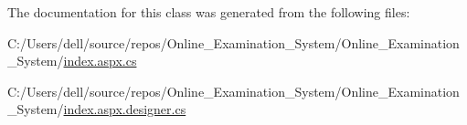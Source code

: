 The documentation for this class was generated from the following files\+:\begin{DoxyCompactItemize}
\item 
C\+:/\+Users/dell/source/repos/\+Online\+\_\+\+Examination\+\_\+\+System/\+Online\+\_\+\+Examination\+\_\+\+System/\mbox{\hyperlink{_index_8aspx_8cs}{index.\+aspx.\+cs}}\item 
C\+:/\+Users/dell/source/repos/\+Online\+\_\+\+Examination\+\_\+\+System/\+Online\+\_\+\+Examination\+\_\+\+System/\mbox{\hyperlink{_index_8aspx_8designer_8cs}{index.\+aspx.\+designer.\+cs}}\end{DoxyCompactItemize}
